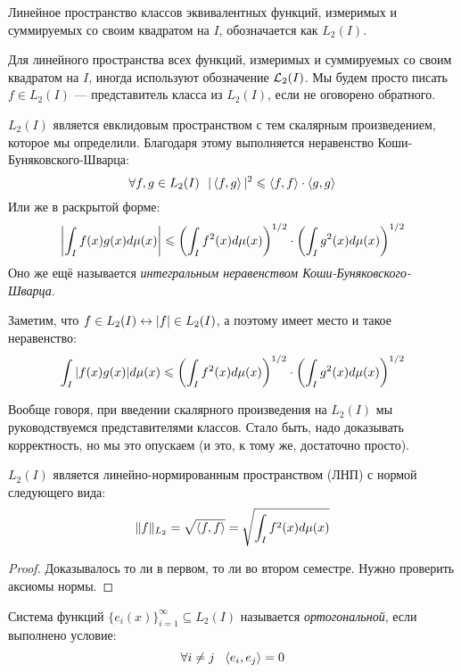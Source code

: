 \begin{definition}
	Линейное пространство классов эквивалентных функций, измеримых и суммируемых со своим квадратом на $I$, обозначается как $L_2(I)$.
\end{definition}

\begin{anote}
	Для линейного пространства всех функций, измеримых и суммируемых со своим квадратом на $I$, иногда используют обозначение $\mathcal{L}_2(I)$. Мы будем просто писать $f \in L_2(I)$ --- представитель класса из $L_2(I)$, если не оговорено обратного.
\end{anote}

\begin{corollary}
	$L_2(I)$ является евклидовым пространством с тем скалярным произведением, которое мы определили. Благодаря этому выполняется неравенство Коши-Буняковского-Шварца:
	\[
		\forall f, g \in L_2(I)\ \ |\left\langle f, g\right\rangle|^2 \leqslant \left\langle f, f\right\rangle \cdot \left\langle g, g\right\rangle
	\]
	Или же в раскрытой форме:
	\[
		\left|\int_I f(x)g(x)d\mu(x)\right| \leqslant \left(\int_I f^2(x)d\mu(x)\right)^{1/2} \cdot \left(\int_I g^2(x)d\mu(x)\right)^{1/2}
	\]
	Оно же ещё называется \textit{интегральным неравенством Коши-Буняковского-Шварца}.
\end{corollary}

\begin{note}
	Заметим, что $f \in L_2(I) \leftrightarrow |f| \in L_2(I)$, а поэтому имеет место и такое неравенство:
	\[
		\int_I |f(x)g(x)|d\mu(x) \leqslant \left(\int_I f^2(x)d\mu(x)\right)^{1/2} \cdot \left(\int_I g^2(x)d\mu(x)\right)^{1/2}
	\]
\end{note}

\begin{anote}
	Вообще говоря, при введении скалярного произведения на $L_2(I)$ мы руководствуемся представителями классов. Стало быть, надо доказывать корректность, но мы это опускаем (и это, к тому же, достаточно просто).
\end{anote}

\begin{proposition}
	$L_2(I)$ является линейно-нормированным пространством (ЛНП) с нормой следующего вида:
	\[
		\|f\|_{L_2} = \sqrt{\left\langle f, f\right\rangle} = \sqrt{\int_I f^2(x)d\mu(x)}
	\]
\end{proposition}

\begin{proof}
	Доказывалось то ли в первом, то ли во втором семестре. Нужно проверить аксиомы нормы.
\end{proof}

\begin{definition}
	Система функций $\{e_i(x)\}_{i = 1}^\infty \subseteq L_2(I)$ называется \textit{ортогональной}, если выполнено условие:
	\[
		\forall i \neq j\ \ \left\langle e_i, e_j\right\rangle = 0
	\]
\end{definition}

